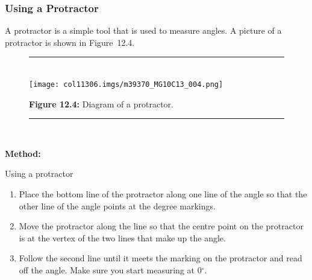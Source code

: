             \subsubsection{ Using a Protractor}
            \nopagebreak
          \label{m39370*id314383}A protractor is a simple tool that is used to measure angles. A picture of a protractor is shown in Figure~12.4.\par 
    \setcounter{subfigure}{0}
	\begin{figure}[H] %
    \begin{center}
    \rule[.1in]{\figurerulewidth}{.005in} \\
        \label{m39370*uid13!!!underscore!!!media}\label{m39370*uid13!!!underscore!!!printimage}\texttt{[image: col11306.imgs/m39370\_MG10C13\_004.png]} %
      \vspace{2pt}
    \vspace{\rubberspace}\par \begin{cnxcaption}
	  \small \textbf{Figure 12.4: }Diagram of a protractor.
	\end{cnxcaption}
    \vspace{.1in}
    \rule[.1in]{\figurerulewidth}{.005in} \\
    \end{center}
 \end{figure}       
          \label{m39370*id314404}
            \textbf{Method:}
          \par 
          \label{m39370*id314412}Using a protractor\par 
          \label{m39370*id314417}\begin{enumerate}[noitemsep, label=\textbf{\arabic*}. ] 
            \label{m39370*uid14}\item Place the bottom line of the protractor along one line of the angle so that the other line of the angle points at the degree markings.
\label{m39370*uid15}\item Move the protractor along the line so that the centre point on the protractor is at the vertex of the two lines that make up the angle.
\label{m39370*uid16}\item Follow the second line until it meets the marking on the protractor and read off the angle. Make sure you start measuring at 0${}^{\circ }$.
\end{enumerate}
\label{m39370*secfhsst!!!underscore!!!id175}
